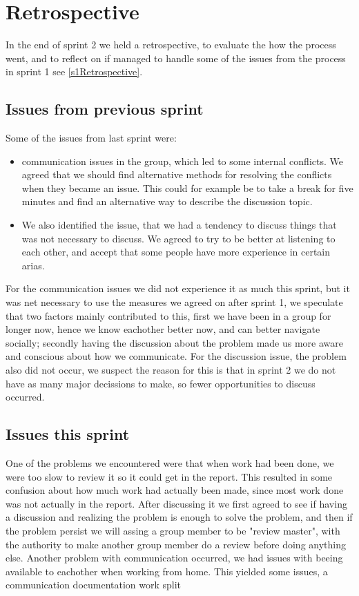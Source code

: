 \section{Retrospective} \label{s2Retrospective}

In the end of sprint 2 we held a retrospective, to evaluate the how the process went, and to reflect on if managed to handle some of the issues from the process in sprint 1 see \autoref{s1Retrospective}.

\subsection{Issues from previous sprint}

Some of the issues from last sprint were:
\begin{itemize}
    \item communication issues in the group, which led to some internal conflicts. We agreed that we should find alternative methods for resolving the conflicts when they became an issue. This could for example be to take a break for five minutes and find an alternative way to describe the discussion topic. 
    \item We also identified the issue, that we had a tendency to discuss things that was not necessary to discuss. We agreed to try to be better at listening to each other, and accept that some people have more experience in certain arias. 
\end{itemize}

For the communication issues we did not experience it as much this sprint, but it was net necessary to use the measures we agreed on after sprint 1, we speculate that two factors mainly contributed to this, first we have been in a group for longer now, hence we know eachother better now, and can better navigate socially; secondly having the discussion about the problem made us more aware and conscious about how we communicate.
For the discussion issue, the problem also did not occur, we suspect the reason for this is that in sprint 2 we do not have  as many major decissions to make, so fewer opportunities to discuss occurred.

\subsection{Issues this sprint}

One of the problems we encountered were that when work had been done, we were too slow to review it so it could get in the report. This resulted in some confusion about how much work had actually been made, since most  work done was not actually in the report. After discussing it we first agreed to see if having a discussion and realizing the problem is enough to solve the problem, and then if the problem persist we will assing a group member to be "review master", with the authority to make another group member do a review before doing anything else.
Another problem with communication occurred, we had issues with beeing available to eachother when working from home.  This yielded some issues, a
communication
documentation
work split


